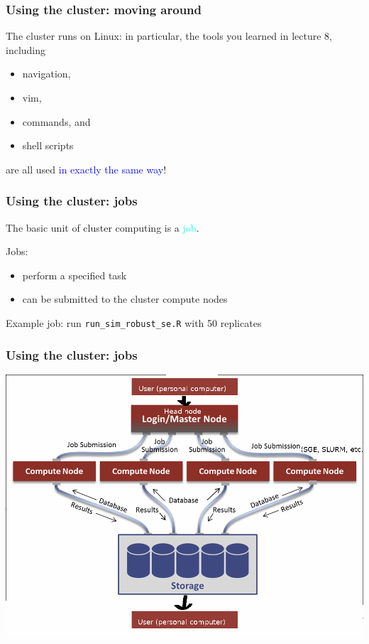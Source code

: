 \documentclass[12pt, 
hyperref={colorlinks=true, linkcolor=BlueViolet, urlcolor=BlueViolet},dvipsnames]{beamer}
\begin{document}
\begin{frame}
\frametitle{Using the cluster: moving around}
The cluster runs on Linux: in particular, the tools you learned in lecture 8, including \vspace{-0.3cm} \pause
\begin{itemize}
\item navigation, \pause
\item vim, \pause
\item commands, \pause and
\item shell scripts
\end{itemize}
are all used \textcolor{blue}{in exactly the same way}!
\end{frame}

\begin{frame}
\frametitle{Using the cluster: jobs}
The basic unit of cluster computing is a \textcolor{cyan}{job}. \pause

Jobs: \vspace{-0.3cm} \pause
\begin{itemize}
\item perform a specified task \pause
\item can be submitted to the cluster compute nodes \pause
\end{itemize}

Example job: run \texttt{run\_sim\_robust\_se.R} with 50 replicates
\end{frame}

\begin{frame}
\frametitle{Using the cluster: jobs}
\begin{center}
\includegraphics[width = 1\textwidth]{plots/hpc_system.png}
\end{center}
\end{frame}
\end{document}
